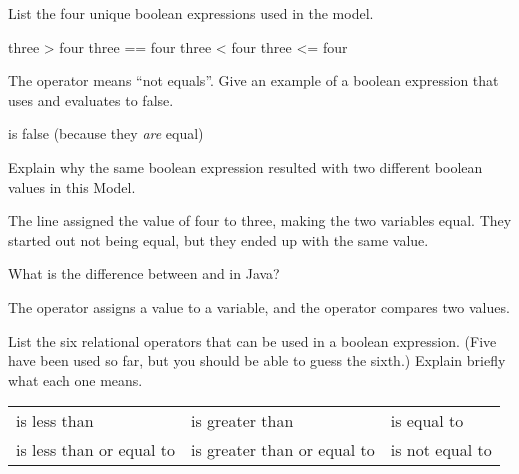 \Q List the four unique boolean expressions used in the model.

\begin{answer}[3em]
\begin{javaans}
    three > four    three == four    three < four    three <= four
\end{javaans}
\end{answer}


\Q The \java{!=} operator means ``not equals''.
Give an example of a boolean expression that uses \java{!=} and evaluates to false.

\begin{answer}[3em]
 is false (because they \emph{are} equal)
\end{answer}


\Q Explain why the same boolean expression  resulted with two different boolean values in this Model.

\begin{answer}
The line  assigned the value of four to three, making the two variables equal.
They started out not being equal, but they ended up with the same value.
\end{answer}


\Q What is the difference between \java{=} and \java{==} in Java?

\begin{answer}
The \java{=} operator assigns a value to a variable, and the \java{==} operator compares two values.
\end{answer}


\Q List the six relational operators that can be used in a boolean expression.
(Five have been used so far, but you should be able to guess the sixth.)
Explain briefly what each one means.

\begin{answer}
\begin{tabular}{lll}
\java{<} is less than              & \java{>} is greater than              & \java{==} is equal to     \\
\java{<=} is less than or equal to & \java{>=} is greater than or equal to & \java{!=} is not equal to \\
\end{tabular}
\end{answer}
